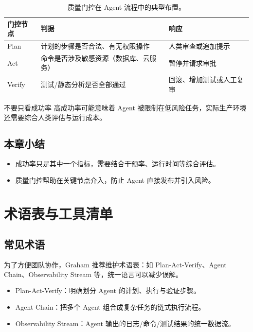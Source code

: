 \documentclass[a4paper]{article}
\begin{document}
\begin{table}[H]
\centering
\begin{tabular}{p{} p{} p{}}
\toprule
门控节点 & 判据 & 响应 \\
\midrule
Plan & 计划的步骤是否合法、有无权限操作 & 人类审查或追加提示 \\
\midrule
Act & 命令是否涉及敏感资源（数据库、云服务） & 暂停并请求审批 \\
\midrule
Verify & 测试/静态分析是否全部通过 & 回滚、增加测试或人工复审 \\
\bottomrule
\end{tabular}
\caption{质量门控在 Agent 流程中的典型布置。}
\end{table}

\begin{warningbox}{不要只看成功率}
高成功率可能意味着 Agent 被限制在低风险任务，实际生产环境还需要综合人类评估与运行成本。
\end{warningbox}

\subsection{本章小结}
\begin{itemize}
    \item 成功率只是其中一个指标，需要结合干预率、运行时间等综合评估。
    \item 质量门控帮助在关键节点介入，防止 Agent 直接发布并引入风险。
\end{itemize}

\section{术语表与工具清单}
\subsection{常见术语}
为了方便团队协作，Graham 推荐维护术语表：如 Plan-Act-Verify、Agent Chain、Observability Stream 等，统一语言可以减少误解。

\begin{itemize}
    \item Plan-Act-Verify：明确划分 Agent 的计划、执行与验证步骤。
    \item Agent Chain：把多个 Agent 组合成复杂任务的链式执行流程。
    \item Observability Stream：Agent 输出的日志/命令/测试结果的统一数据流。
\end{itemize}
\end{document}
